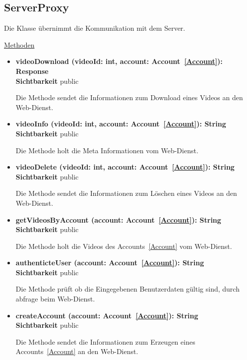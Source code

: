 \newpage
\subsection{ServerProxy}\label{ServerProxy}

Die Klasse übernimmt die Kommunikation mit dem Server.

\underline{Methoden}
\begin{itemize}
\itemsep0pt

\item \textbf{videoDownload (videoId: int, account: Account~\eqref{Account}): Response}\hfill\\
\textbf{Sichtbarkeit} public

Die Methode sendet die Informationen zum Download eines Videos an den Web-Dienst.

\item \textbf{videoInfo (videoId: int, account: Account~\eqref{Account}): String}\hfill\\
\textbf{Sichtbarkeit} public

Die Methode holt die Meta Informationen vom Web-Dienst.

\item \textbf{videoDelete (videoId: int, account: Account~\eqref{Account}): String}\hfill\\
\textbf{Sichtbarkeit} public

Die Methode sendet die Informationen zum Löschen eines Videos an den Web-Dienst.

\item \textbf{getVideosByAccount (account: Account~\eqref{Account}): String}\hfill\\
\textbf{Sichtbarkeit} public

Die Methode holt die Videos des Accounts~\eqref{Account} vom Web-Dienst.

\item \textbf{authenticteUser (account: Account~\eqref{Account}): String}\hfill\\
\textbf{Sichtbarkeit} public

Die Methode prüft ob die Eingegebenen Benutzerdaten gültig sind, durch abfrage beim Web-Dienst.

\item \textbf{createAccount (account: Account~\eqref{Account}): String}\hfill\\
\textbf{Sichtbarkeit} public

Die Methode sendet die Informationen zum Erzeugen eines Accounts~\eqref{Account} an den Web-Dienst.


\end{itemize}

